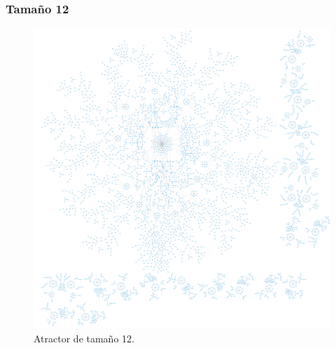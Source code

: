 \documentclass[11pt]{article}
\begin{document}
			\subsubsection{Tamaño 12}
			\begin{figure}[H]
			\centering
			\includegraphics[scale=0.1]{resources/Atractores22/atractor_22_size_12.png}
			\caption{Atractor de tamaño 12.}\label{fig:picture}
			\end{figure}
\end{document}
